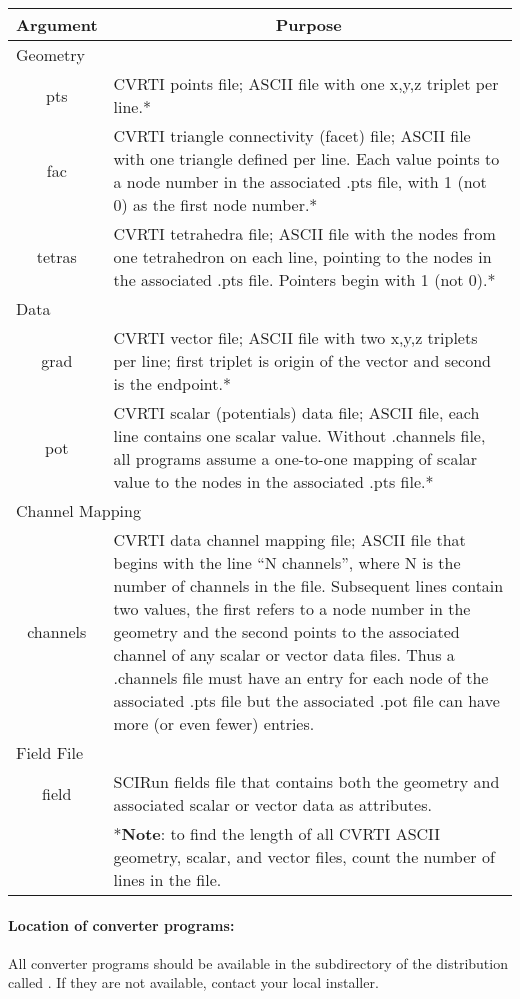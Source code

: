 \begin{center}
\begin{tabular}{|c|p{4in}|} \hline
\multicolumn{1}{|c|}{Argument} &
\multicolumn{1}{|c|}{Purpose} \\ \hline
\multicolumn{2}{|l|}{Geometry} \\ \hline
pts & CVRTI points file; ASCII file with one x,y,z triplet per line.*\\
fac & CVRTI triangle connectivity (facet) file; ASCII file with one
    triangle defined per line.  Each value points to a node number in the
    associated .pts file, with 1 (not 0) as the first node number.*  \\
tetras & CVRTI tetrahedra file; ASCII file with the nodes from one
    tetrahedron on each line, pointing to the nodes in the associated .pts
    file.  Pointers begin with 1 (not 0).*\\ \hline
\multicolumn{2}{|l|}{Data} \\ \hline
grad & CVRTI vector file; ASCII file with two x,y,z triplets per line;
    first triplet is origin of the vector and second is the endpoint.*\\
pot & CVRTI scalar (potentials) data file; ASCII file,  each line contains
    one scalar value.  Without .channels file, all programs assume a
    one-to-one mapping of scalar value to the  nodes in the associated .pts
    file.*\\ \hline
\multicolumn{2}{|l|}{Channel Mapping} \\ \hline
channels & CVRTI data channel mapping file; ASCII file that begins with the
    line ``N channels'', where N is the number of channels in the file.
    Subsequent lines contain two values, the first refers to a node number in
    the geometry and the second points to the associated channel of any scalar
    or vector data files.  Thus a .channels file must have an entry for each
    node of the associated .pts file but the associated .pot file can have more
    (or even fewer) entries.\\ \hline
\multicolumn{2}{|l|}{Field File} \\ \hline
field & SCIRun fields file that contains both the geometry and associated
    scalar or vector data as attributes. \\ \hline
& *\textbf{Note}: to find the length of all CVRTI ASCII geometry,
scalar, and vector files, count the number of lines in the file. \\
\hline
\end{tabular}
\end{center}

\paragraph{Location of converter programs:}
All converter programs should be available in the subdirectory of the
\sr{} distribution called .  If they are
not available, contact your local \sr{} installer.
